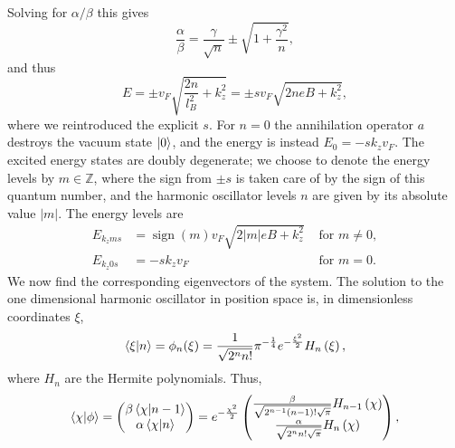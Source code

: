 Solving for $\alpha /\beta $ this gives
\begin{equation}
  \frac{\alpha}{\beta } = \frac{\gamma}{\sqrt{n}} \pm \sqrt{1 + \frac{\gamma^2}{n}},
\end{equation}
and thus
\begin{equation}
  E = \pm v_F \sqrt{
    \frac{2n}{l_B^2} + k_z^2
  }
  = \pm s v_F \sqrt{
    2n e B  + k_z^2
  },
\end{equation}
where we reintroduced the explicit $s$.
For $n = 0$ the annihilation operator $a$ destroys the vacuum state $\ket{0}$, and the energy is instead $E_0 = - s k_z v_F$.
The excited energy states are doubly degenerate;
we choose to denote the energy levels by $m \in \mathbb{Z}$, where the sign from $\pm s$ is taken care of by the sign of this quantum number, and the harmonic oscillator levels $n$ are given by its absolute value $|m|$.
The energy levels are
\begin{subequations}
  \label{eq:26}
  \begin{align}
    \label{eq:27}
    E_{k_z m s} &= \operatorname{sign}(m) v_F \sqrt{2 |m| e B   + k_z^2 } & \text{ for } m \neq 0,\\
    \label{eq:28}
    E_{k_z 0 s} &= -s  k_z v_F & \text{ for } m = 0.
  \end{align}
\end{subequations}
We now find the corresponding eigenvectors of the system.
The solution to the one dimensional harmonic oscillator in position space is, in dimensionless coordinates $\xi$,~\cite[Eq.~18.39.5]{NIST:DLMF}
\begin{equation}
  \braket{\xi | n} = \phi _n (\xi)
  = \frac{1}{\sqrt{2^nn!}} \pi^{-\frac{1}{4}}
  e^{- \frac{\xi^2}{2}} H_n \left( \xi \right),
\end{equation}
where $H_n$ are the Hermite polynomials.
Thus,
\begin{equation}
  \braket{\chi | \phi } =
  \begin{pmatrix}
    \beta \braket{\chi | n-1}\\
    \alpha \braket{\chi | n}
  \end{pmatrix}
  =
  e^{- \frac{\chi^2}{2}}
  \begin{pmatrix}
    \frac{\beta }{\sqrt{2^{n-1}(n-1)!\sqrt{\pi }}} H_{n-1} \left( \chi \right)\\
    \frac{\alpha }{\sqrt{2^{n}n!\sqrt{\pi }}} H_n \left(\chi \right)\\
  \end{pmatrix},
\end{equation}
